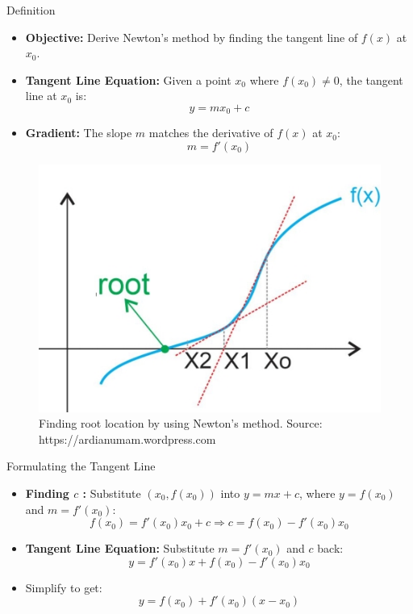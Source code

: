 \documentclass[serif, aspectratio=169]{beamer}
\begin{document}
\begin{frame}{Definition}
\begin{minipage}{0.55\linewidth}
\begin{itemize}
    \item \textbf{Objective:} Derive Newton’s method by finding the tangent line of \( f(x) \) at \( x_0 \).
    \item \textbf{Tangent Line Equation:} Given a point \( x_0 \) where \( f(x_0) \neq 0 \), the tangent line at \( x_0 \) is:
    \[
    y = mx_0 + c
    \]
    \item \textbf{Gradient:} The slope \( m \) matches the derivative of \( f(x) \) at \( x_0 \):
    \[
    m = f'(x_0)
    \]
\end{itemize}
\end{minipage}%
\begin{minipage}{0.35\linewidth}
    \begin{figure}
        \centering
        \includegraphics[width=1\linewidth]{pic/newton_raphson_ardianumam.jpg}
        \caption{Finding root location by using Newton’s method. Source: https://ardianumam.wordpress.com}
    \end{figure}
\end{minipage}
\end{frame}

\begin{frame}{Formulating the Tangent Line}
\begin{itemize}
    \item \textbf{Finding \( c \) :} Substitute \( (x_0, f(x_0)) \) into \( y = mx + c \), where \( y = f(x_0) \) and \( m = f'(x_0) \):
    \[
    f(x_0) = f'(x_0)x_0 + c \Rightarrow c = f(x_0) - f'(x_0)x_0
    \]
    \item \textbf{Tangent Line Equation:} Substitute \( m = f'(x_0) \) and \( c \) back:
    \[
    y = f'(x_0)x + f(x_0) - f'(x_0)x_0
    \]
    \item Simplify to get:
    \[
    y = f(x_0) + f'(x_0)(x - x_0)
    \]
\end{itemize}
\end{frame}
\end{document}
